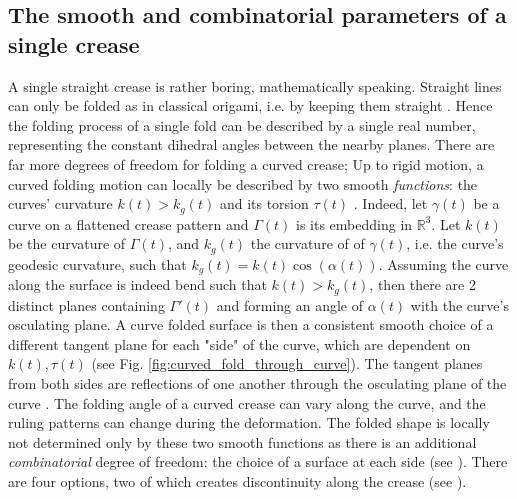 \subsection{The smooth and combinatorial parameters of a single crease}
A single straight crease is rather boring, mathematically speaking. Straight lines can only be folded as in classical origami, i.e. by keeping them straight \cite{demaine_lens}. Hence the folding process of a single fold can be described by a single real number, representing the constant dihedral angles between the nearby planes. There are far more degrees of freedom for folding a curved crease; Up to rigid motion, a curved folding motion can locally be described by two smooth \textit{functions}: the curves' curvature $k(t) > k_g(t)$ and its torsion $\tau(t)$  \cite{more_on_paper, duncan_folded}. Indeed, let $\gamma(t)$ be a curve on a flattened crease pattern and $\Gamma(t)$ is its embedding in $\mathbb{R}^3$. Let $k(t)$ be the curvature of $\Gamma(t)$, and $k_g(t)$ the curvature of of $\gamma(t)$, i.e. the curve's geodesic curvature, such that $k_g(t) = k(t) \cos(\alpha(t))$. Assuming the curve along the surface is indeed bend such that $k(t) > k_g(t)$, then there are 2 distinct planes containing $\Gamma'(t)$ and forming an angle of $\alpha(t)$ with the curve's osculating plane. A curve folded surface is then a consistent smooth choice of a different tangent plane for each "side" of the curve, which are dependent on $k(t),\tau(t)$ (see Fig. \ref{fig:curved_fold_through_curve}). The tangent planes from both sides are reflections of one another through the osculating plane of the curve \cite{curved_folding_kilian}.
The folding angle of a curved crease can vary along the curve, and the ruling patterns can change during the deformation. The folded shape is locally not determined only by these two smooth functions as there is an additional \textit{combinatorial} degree of freedom: the choice of a surface at each side (see ). There are four options, two of which creates discontinuity along the crease (see ). %


